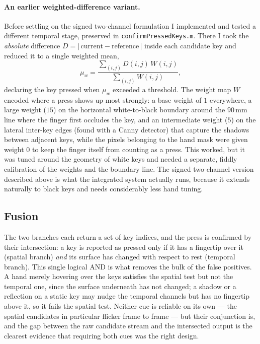 \documentclass[11pt]{article}
\begin{document}
\paragraph{An earlier weighted-difference variant.}
Before settling on the signed two-channel formulation I implemented and tested a
different temporal stage, preserved in \texttt{confirmPressedKeys.m}. There I took
the \emph{absolute} difference $D=\lvert\,\text{current}-\text{reference}\,\rvert$
inside each candidate key and reduced it to a single weighted mean,
\begin{equation}
  \mu_w = \frac{\sum_{(i,j)} D(i,j)\,W(i,j)}{\sum_{(i,j)} W(i,j)},
  \label{eq:weightedmean}
\end{equation}
declaring the key pressed when $\mu_w$ exceeded a threshold. The weight map $W$
encoded where a press shows up most strongly: a base weight of $1$ everywhere, a
large weight ($15$) on the horizontal white-to-black boundary around the $90$\,mm
line where the finger first occludes the key, and an intermediate weight ($5$) on
the lateral inter-key edges (found with a Canny detector) that capture the shadows
between adjacent keys, while the pixels belonging to the hand mask were given
weight $0$ to keep the finger itself from counting as a press. This worked, but it
was tuned around the geometry of white keys and needed a separate, fiddly
calibration of the weights and the boundary line. The signed two-channel version
described above is what the integrated system actually runs, because it extends
naturally to black keys and needs considerably less hand tuning.

\subsection{Fusion}
\label{sec:fusion}
The two branches each return a set of key indices, and the press is confirmed by
their intersection: a key is reported as pressed only if it has a fingertip over
it (spatial branch) \emph{and} its surface has changed with respect to rest
(temporal branch). This single logical AND is what removes the bulk of the false
positives. A hand merely hovering over the keys satisfies the spatial test but
not the temporal one, since the surface underneath has not changed; a shadow or a
reflection on a static key may nudge the temporal channels but has no fingertip
above it, so it fails the spatial test. Neither cue is reliable on its own --- the
spatial candidates in particular flicker frame to frame --- but their conjunction
is, and the gap between the raw candidate stream and the intersected output is the
clearest evidence that requiring both cues was the right design.
\end{document}
